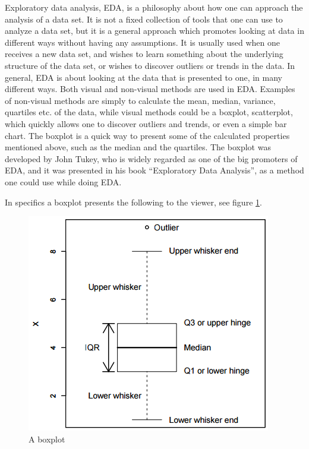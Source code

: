 \documentclass[Report.tex]{subfiles}
\begin{document}
Exploratory data analysis, EDA, is a philosophy about how one can approach the analysis of a data set.
It is not a fixed collection of tools that one can use to analyze a data set, but it is a general
approach which promotes looking at data in different ways without having any assumptions. It is usually
used when one receives a new data set, and wishes to learn something about the underlying structure of the
data set, or wishes to discover outliers or trends in the data. In general, EDA is about looking at
the data that is presented to one, in many different ways. Both visual and non-visual methods are used
in EDA. Examples of non-visual methods are simply to calculate the mean, median, variance, quartiles etc. of
the data, while visual methods could be a boxplot, scatterplot, which quickly allows one to discover outliers and trends, or even a simple
bar chart. The boxplot is a quick way to present some of the calculated properties mentioned above, such as the median and the 
quartiles. The boxplot was developed by John Tukey\cite{Weimer}, who is widely regarded as one of the big promoters of EDA, and
it was presented in his book ``Exploratory Data Analysis'', as a method one could use while doing EDA.

In specifics a boxplot\cite{Seltman} presents the following to the viewer, see figure \ref{fig:boxplot}.

\begin{figure}
\center
\includegraphics[]{"Figures/boxplot"}
\caption{A boxplot\cite{Seltman}}
\label{fig:boxplot}
\end{figure}
\end{document}
